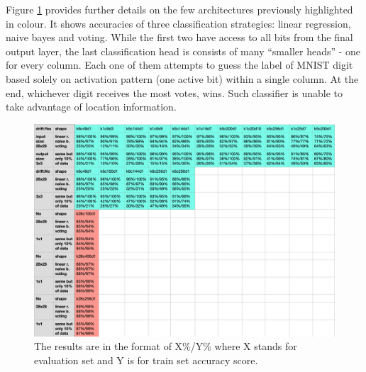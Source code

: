 \documentclass[12pt]{article}
\begin{document}
Figure \ref{fig:benchmarks_votes} provides further details on the few architectures previously highlighted in colour. It shows accuracies of three classification strategies: linear regression, naive bayes and voting. While the first two have access to all bits from the final output layer, the last classification head is consists of many ``smaller heads'' - one for every column. Each one of them attempts to guess the label of MNIST digit based solely on activation pattern (one active bit) within a single column. At the end, whichever digit receives the most votes, wins. Such classifier is unable to take advantage of location information. 

\begin{figure}[!htbp]
	\centering
	\includegraphics[width=13.8cm]{benchmarks_votes}
	\caption{The results are in the format of X\%/Y\%  where X stands for evaluation set and Y is for train set accuracy score.}
	\label{fig:benchmarks_votes}
\end{figure} 
\end{document}
